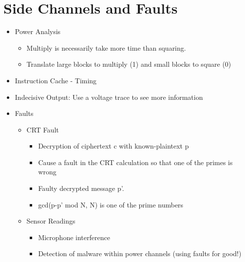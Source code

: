 \section{Side Channels and Faults} 
\begin{itemize} 
\item Power Analysis 
    \begin{itemize}
    \item Multiply is necessarily take more time than squaring.
    \item Translate large blocks to multiply (1) and small blocks to square (0)
    \end{itemize}
\item Instruction Cache - Timing
\item Indecisive Output: Use a voltage trace to see more information
\item Faults
    \begin{itemize}
    \item CRT Fault
        \begin{itemize}
        \item Decryption of ciphertext c with known-plaintext p
        \item Cause a fault in the CRT calculation so that one of the primes is wrong
        \item Faulty decrypted message p'. 
        \item gcd(p-p' mod N, N) is one of the prime numbers
        \end{itemize}
    \item Sensor Readings
        \begin{itemize}
        \item Microphone interference
        \item Detection of malware within power channels (using faults for good!)
        \end{itemize}
    \end{itemize}
\end{itemize}